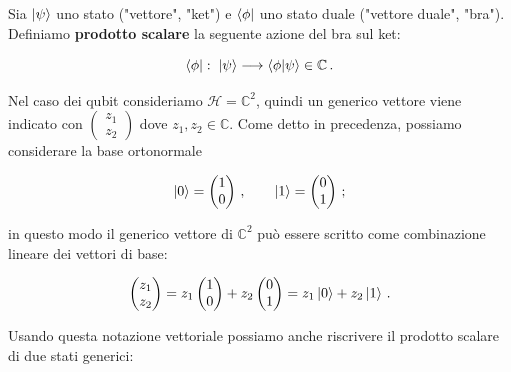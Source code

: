 \begin{definizione}
    Sia $\ket{\psi}$ uno stato ("vettore", "ket") e $\bra{\phi}$ uno stato duale ("vettore duale", "bra"). Definiamo \textbf{prodotto scalare} la seguente azione del bra sul ket: 
    
    \begin{equation*}
        \bra{\phi}: \; \ket{\psi} \longrightarrow \braket{\phi}{\psi} \in \mathbb{C} \, .
    \end{equation*}
    
\end{definizione}

\noindent Nel caso dei qubit consideriamo $\mathcal{H} = \mathbb{C}^2$, quindi un generico vettore viene indicato con $\begin{pmatrix} z_1 \\ z_2 \end{pmatrix}$ dove $z_1,z_2\in\mathbb{C}$. Come detto in precedenza, possiamo considerare la base ortonormale

\begin{equation}\label{computational_basis}
    \ket{0} = \begin{pmatrix} 1 \\ 0 \end{pmatrix} \, , \qquad \ket{1} = \begin{pmatrix} 0 \\ 1 \end{pmatrix} \, ;
\end{equation}

\noindent in questo modo il generico vettore di $\mathbb{C}^2$ può essere scritto come combinazione lineare dei vettori di base:

\begin{equation*}
\begin{pmatrix} z_1 \\ z_2 \end{pmatrix} = z_1 \begin{pmatrix} 1 \\ 0 \end{pmatrix} + z_2 \begin{pmatrix} 0 \\ 1 \end{pmatrix} = z_1 \ket{0} + z_2 \ket{1} \, .
\end{equation*}

\noindent Usando questa notazione vettoriale possiamo anche riscrivere il prodotto scalare di due stati generici:

